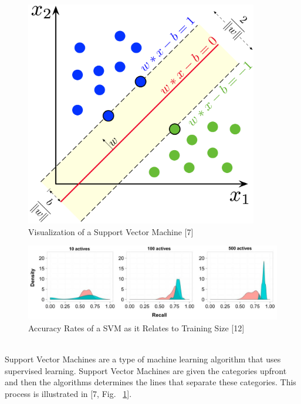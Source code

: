 \documentclass[12pt,journal,compsoc]{IEEEtran}
\newenvironment{subs}
  {\adjustwidth{1em}{0pt}}
  {\endadjustwidth}
\begin{document}
\begin{subs}
\begin{subs}
\begin{subs}
\begin{figure}[H]
\centering
\includegraphics[width=4in]{images/svm_visual.png}
\caption{Visualization of a Support Vector Machine [7]}
\label{fig:svm_visual}
\end{figure}

\begin{figure}[H]
\centering
\includegraphics[width=7in]{images/svm_accruacy.jpg}
\caption{Accuracy Rates of a SVM as it Relates to Training Size [12]}
\label{fig:accuracy_svm}
\end{figure}

\\
Support Vector Machines are a type of machine learning algorithm that uses supervised learning. Support Vector Machines are given the categories upfront and then the algorithms determines the lines that separate these categories. This process is illustrated in [7, Fig. ~\ref{fig:svm_visual}].


\end{subs}
\end{subs}
\end{subs}
\end{document}

